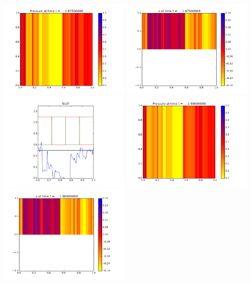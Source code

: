 \documentclass[11pt]{article}
\begin{document}
\vskip 10pt 
\includegraphics[width=0.475\textwidth]{frame0075fig0.png}
\includegraphics[width=0.475\textwidth]{frame0075fig1.png}
\vskip 10pt 
\includegraphics[width=0.475\textwidth]{frame0075fig3.png}
\vskip 10pt 
\includegraphics[width=0.475\textwidth]{frame0076fig0.png}
\includegraphics[width=0.475\textwidth]{frame0076fig1.png}
\end{document}
